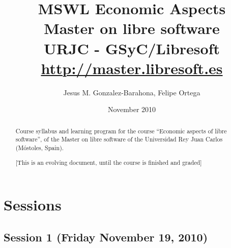 \documentclass[a4paper]{article}
\title{MSWL Economic Aspects \\
Master on libre software \\
URJC - GSyC/Libresoft \\
\url{http://master.libresoft.es}}
\author{Jesus M. Gonzalez-Barahona, Felipe Ortega}
\date{November 2010}
\begin{document}
\maketitle

\begin{abstract}
Course syllabus and learning program for the course ``Economic aspects of libre software'', of the Master on libre software of the Universidad Rey Juan Carlos (Móstoles, Spain).

[This is an evolving document, until the course is finished and graded]
\end{abstract}

\tableofcontents


\section{Sessions}

\subsection{Session 1 (Friday November 19, 2010)}
\end{document}
